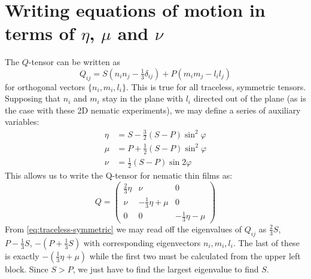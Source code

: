 \documentclass[reqno]{article}
\begin{document}
	\section{Writing equations of motion in terms of $\eta$, $\mu$ and $\nu$}
	The $Q$-tensor can be written as
	\begin{equation} \label{eq:traceless-symmetric}
		Q_{ij} = S\left(n_i n_j - \tfrac13\delta_{ij}\right) + P\left(m_i m_j - l_i l_j \right)
	\end{equation}
	for orthogonal vectors $\{n_i, m_i, l_i\}$. This is true for all traceless, symmetric tensors. Supposing that $n_i$ and $m_i$ stay in the plane with $l_i$ directed out of the plane (as is the case with these 2D nematic experiments), we may define a series of auxiliary variables:
	\begin{align}
		\eta &= S - \tfrac32 \left( S - P \right) \sin^2\varphi \\
		\mu &= P + \tfrac12 \left( S - P \right) \sin^2\varphi \\
		\nu &= \tfrac12\left( S - P \right) \sin 2\varphi
	\end{align}
	This allows us to write the Q-tensor for nematic thin films as:
	\begin{equation}
		Q = 
		\begin{pmatrix}
		\frac{2}{3} \eta & \nu & 0\\
		\nu & -\frac{1}{3}\eta + \mu & 0 \\
		0 & 0 & -\frac{1}{3}\eta - \mu
		\end{pmatrix}
	\end{equation}
	From \eqref{eq:traceless-symmetric} we may read off the eigenvalues of $Q_{ij}$ as $\frac23 S$, $P - \frac13 S$, $-(P + \frac13 S)$ with corresponding eigenvectors $n_i, m_i, l_i$. The last of these is exactly $-(\frac13 \eta + \mu)$ while the first two must be calculated from the upper left block. Since $S > P$, we just have to find the largest eigenvalue to find $S$. 
	
\end{document}
